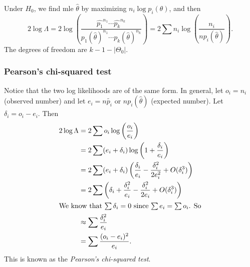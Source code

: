 \documentclass[a4paper]{article}
\begin{document}
Under $H_0$, we find mle $\hat{\theta}$ by maximizing $n_i \log p_i (\theta)$, and then
\[
  2\log \Lambda = 2\log \left(\frac{\hat{p_1}^{n_1}\cdots \hat{p_k}^{n_k}}{p_1(\hat{\theta})^{n_1}\cdots p_k (\hat{\theta})^{n_k}}\right) = 2\sum n_i \log \left(\frac{n_i}{np_i(\hat{\theta})}\right).\tag{2}
\]
The degrees of freedom are $k - 1 - |\Theta_0|$.

\subsubsection{Pearson's chi-squared test}
Notice that the two log likelihoods are of the same form. In general, let $o_i = n_i$ (observed number) and let $e_i = n\tilde{p_i}$ or $np_i(\hat{\theta})$ (expected number). Let $\delta_i = o_i - e_i$. Then
\begin{align*}
  2\log \Lambda &= 2\sum o_i \log \left(\frac{o_i}{e_i}\right)\\
  &= 2\sum (e_i + \delta_i) \log\left(1 + \frac{\delta_i}{e_i}\right)\\
  &= 2\sum (e_i + \delta_i) \left(\frac{\delta_i}{e_i} - \frac{\delta_i^2}{2e_i^2} + O(\delta_i^3)\right)\\
  &= 2\sum \left(\delta_i + \frac{\delta_i^2}{e_i} - \frac{\delta_i^2}{2e_i} + O(\delta_i^3)\right)\\
  \intertext{We know that $\sum \delta_i = 0$ since $\sum e_i = \sum o_i$. So}
  &\approx \sum \frac{\delta_i^2}{e_i}\\
  &= \sum\frac{(o_i - e_i)^2}{e_i}.
\end{align*}
This is known as the \emph{Pearson's chi-squared test}.
\end{document}
